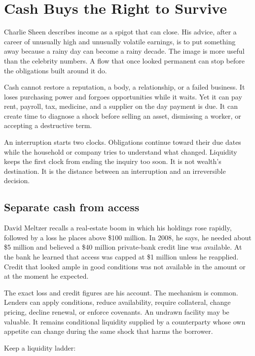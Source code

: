 \chapter{Cash Buys the Right to Survive}

Charlie Sheen describes income as a spigot that can close. His advice, after a
career of unusually high and unusually volatile earnings, is to put something
away because a rainy day can become a rainy decade. The image is more useful
than the celebrity numbers. A flow that once looked permanent can stop before
the obligations built around it do.

Cash cannot restore a reputation, a body, a relationship, or a failed business.
It loses purchasing power and forgoes opportunities while it waits. Yet it can
pay rent, payroll, tax, medicine, and a supplier on the day payment is due. It
can create time to diagnose a shock before selling an asset, dismissing a
worker, or accepting a destructive term.

An interruption starts two clocks. Obligations continue toward their due dates
while the household or company tries to understand what changed. Liquidity
keeps the first clock from ending the inquiry too soon. It is not wealth's
destination. It is the distance between an interruption and an irreversible
decision.

\section{Separate cash from access}

David Meltzer recalls a real-estate boom in which his holdings rose rapidly,
followed by a loss he places above \$100 million. In 2008, he says, he needed
about \$5 million and believed a \$40 million private-bank credit line was
available. At the bank he learned that access was capped at \$1 million unless
he reapplied. Credit that looked ample in good conditions was not available in
the amount or at the moment he expected.

The exact loss and credit figures are his account. The mechanism is common.
Lenders can apply conditions, reduce availability, require collateral, change
pricing, decline renewal, or enforce covenants. An undrawn facility may be
valuable. It remains conditional liquidity supplied by a counterparty whose
own appetite can change during the same shock that harms the borrower.

Keep a liquidity ladder:

